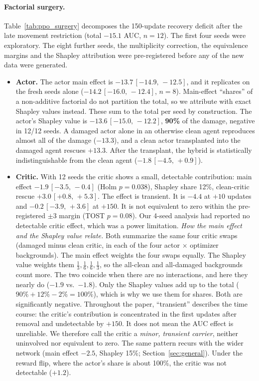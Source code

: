 \documentclass[10pt]{article} %
\newcommand{\ci}[2]{\,[#1,\,#2]}
\begin{document}
\paragraph{Factorial surgery.}
Table~\ref{tab:ppo_surgery} decomposes the 150-update recovery deficit after the late movement restriction (total $-15.1$ AUC, $n=12$). The first four seeds were exploratory. The eight further seeds, the multiplicity correction, the equivalence margins and the Shapley attribution were pre-registered before any of the new data were generated.
\begin{itemize}
\item \textbf{Actor.} The actor main effect is $-13.7\ci{-14.9}{-12.5}$, and it replicates on the fresh seeds alone ($-14.2\ci{-16.0}{-12.4}$, $n=8$). Main-effect ``shares'' of a non-additive factorial do not partition the total, so we attribute with exact Shapley values instead. These sum to the total per seed by construction. The actor's Shapley value is $-13.6\ci{-15.0}{-12.2}$, \textbf{90\%} of the damage, negative in 12/12 seeds. A damaged actor alone in an otherwise clean agent reproduces almost all of the damage ($-13.3$), and a clean actor transplanted into the damaged agent rescues $+13.3$. After the transplant, the hybrid is statistically indistinguishable from the clean agent ($-1.8\ci{-4.5}{+0.9}$).
\item \textbf{Critic.} With 12 seeds the critic shows a small, detectable contribution: main effect $-1.9\ci{-3.5}{-0.4}$ (Holm $p=0.038$), Shapley share 12\%, clean-critic rescue $+3.0\ci{+0.8}{+5.3}$. The effect is transient. It is $-4.4$ at $+10$ updates and $-0.2\ci{-3.9}{+3.6}$ at $+150$. It is not equivalent to zero within the pre-registered $\pm3$ margin (TOST $p=0.08$). Our 4-seed analysis had reported no detectable critic effect, which was a power limitation.
\emph{How the main effect and the Shapley value relate.} Both summarize the same four critic swaps (damaged minus clean critic, in each of the four actor $\times$ optimizer backgrounds). The main effect weights the four swaps equally. The Shapley value weights them $\tfrac13,\tfrac16,\tfrac16,\tfrac13$, so the all-clean and all-damaged backgrounds count more. The two coincide when there are no interactions, and here they nearly do ($-1.9$ vs.\ $-1.8$). Only the Shapley values add up to the total ($90\%+12\%-2\%=100\%$), which is why we use them for shares. Both are significantly negative.
Throughout the paper, ``transient'' describes the time course: the critic's contribution is concentrated in the first updates after removal and undetectable by $+150$. It does not mean the AUC effect is unreliable. We therefore call the critic a \emph{minor, transient carrier}, neither uninvolved nor equivalent to zero. The same pattern recurs with the wider network (main effect $-2.5$, Shapley 15\%; Section~\ref{sec:general}). Under the reward flip, where the actor's share is about 100\%, the critic was not detectable ($+1.2$).

\end{itemize}
\end{document}
